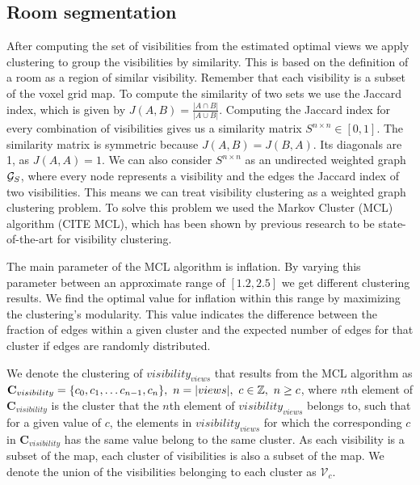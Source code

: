 \subsection{Room segmentation}
After computing the set of visibilities from the estimated optimal views we apply clustering to group the visibilities by similarity. This is based on the definition of a room as a region of similar visibility. Remember that each visibility is a subset of the voxel grid map. To compute the similarity of two sets we use the Jaccard index, which is given by \(J(A,B) = \frac{|A \cap B|}{|A \cup B|}\). Computing the Jaccard index for every combination of visibilities gives us a similarity matrix \(S^{n \times n} \in [0, 1]\). The similarity matrix is symmetric because \(J(A,B) = J(B,A)\). Its diagonals are 1, as \(J(A,A) = 1\). We can also consider \(S^{n \times n}\) as an undirected weighted graph \(\mathcal{G}_S\), where every node represents a visibility and the edges the Jaccard index of two visibilities. This means we can treat visibility clustering as a weighted graph clustering problem. To solve this problem we used the Markov Cluster (MCL) algorithm (CITE MCL), which has been shown by previous research to be state-of-the-art for visibility clustering. 

The main parameter of the MCL algorithm is inflation. By varying this parameter between an approximate range of \([1.2, 2.5]\) we get different clustering results. We find the optimal value for inflation within this range by maximizing the clustering's modularity. This value indicates the difference between the fraction of edges within a given cluster and the expected number of edges for that cluster if edges are randomly distributed. 


We denote the clustering of \(visibility_{views}\) that results from the MCL algorithm as \(\mathbf{C}_{visibility} = \{c_0, c_1, \dots c_{n-1}, c_{n}\},\ n=|views|,\ c \in \mathbb{Z},\ n \geq c\), where \(n\)th element of \(\mathbf{C}_{visibility}\) is the cluster that the \(n\)th element of \(visibility_{views}\) belongs to, such that for a given value of \(c\), the elements in \(visibility_{views}\) for which the corresponding \(c\) in \(\mathbf{C}_{visibility}\) has the same value belong to the same cluster. As each visibility is a subset of the map, each cluster of visibilities is also a subset of the map. We denote the union of the visibilities belonging to each cluster as \(\mathcal{V}_{c}\). 

